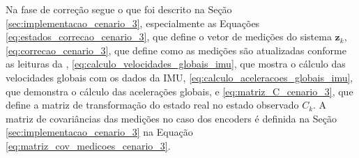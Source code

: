 \documentclass[acronym, symbols, table]{fei}
\begin{document}
			Na fase de correção segue o que foi descrito na Seção \ref{sec:implementacao_cenario_3}, especialmente as Equações \ref{eq:estados_correcao_cenario_3}, que define o vetor de medições do sistema $\textbf{z}_k$, \ref{eq:correcao_cenario_3}, que define como as medições são atualizadas conforme as leituras da , \ref{eq:calculo_velocidades_globais_imu}, que mostra o cálculo das velocidades globais com os dados da IMU, \ref{eq:calculo_aceleracoes_globais_imu}, que demonstra o cálculo das acelerações globais, e \ref{eq:matriz_C_cenario_3}, que define a matriz de transformação do estado real no estado observado $C_{k}$. A matriz de covariâncias das medições no caso dos encoders é definida na Seção \ref{sec:implementacao_cenario_3} na Equação \ref{eq:matriz_cov_medicoes_cenario_3}.
		
%		
%				
%				
\end{document}
